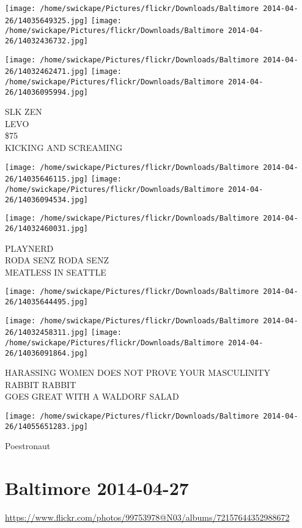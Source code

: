 \documentclass[10pt,letterpaper]{article}
\begin{document}
\texttt{[image: /home/swickape/Pictures/flickr/Downloads/Baltimore 2014-04-26/14035649325.jpg]}
\texttt{[image: /home/swickape/Pictures/flickr/Downloads/Baltimore 2014-04-26/14032436732.jpg]}

\texttt{[image: /home/swickape/Pictures/flickr/Downloads/Baltimore 2014-04-26/14032462471.jpg]}
\texttt{[image: /home/swickape/Pictures/flickr/Downloads/Baltimore 2014-04-26/14036095994.jpg]}

SLK ZEN\\
LEVO\\
\$75\\
KICKING AND SCREAMING
\pagebreak

\texttt{[image: /home/swickape/Pictures/flickr/Downloads/Baltimore 2014-04-26/14035646115.jpg]}
\texttt{[image: /home/swickape/Pictures/flickr/Downloads/Baltimore 2014-04-26/14036094534.jpg]}

\texttt{[image: /home/swickape/Pictures/flickr/Downloads/Baltimore 2014-04-26/14032460031.jpg]}

PLAYNERD\\
RODA SENZ RODA SENZ\\
MEATLESS IN SEATTLE
\pagebreak

\texttt{[image: /home/swickape/Pictures/flickr/Downloads/Baltimore 2014-04-26/14035644495.jpg]}

\vspace{0.25in}
\texttt{[image: /home/swickape/Pictures/flickr/Downloads/Baltimore 2014-04-26/14032458311.jpg]}
\texttt{[image: /home/swickape/Pictures/flickr/Downloads/Baltimore 2014-04-26/14036091864.jpg]}

HARASSING WOMEN DOES NOT PROVE YOUR MASCULINITY\\
RABBIT RABBIT\\
GOES GREAT WITH A WALDORF SALAD
\pagebreak

\texttt{[image: /home/swickape/Pictures/flickr/Downloads/Baltimore 2014-04-26/14055651283.jpg]}

Poestronaut
\pagebreak

\section*{Baltimore 2014-04-27}

\url{https://www.flickr.com/photos/99753978@N03/albums/72157644352988672}
\end{document}
